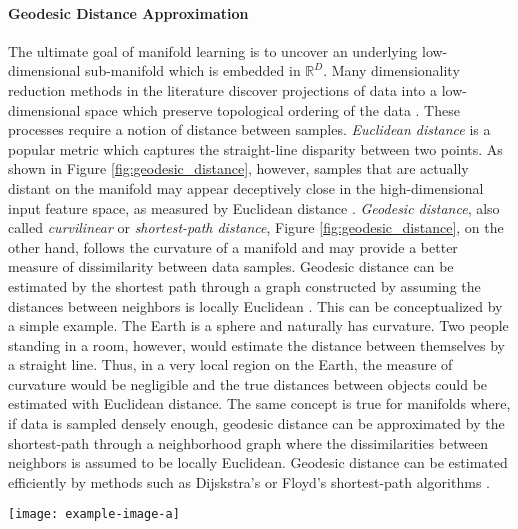 \paragraph{Geodesic Distance Approximation}
The ultimate goal of manifold learning is to uncover an underlying low-dimensional sub-manifold which is embedded in $\mathbb{R}^{D}$.  Many dimensionality reduction methods in the literature discover projections of data into a low-dimensional space which preserve topological ordering of the data \citep{Kegl2008PrincipalManifoldsTextbook}.  These processes require a notion of distance between samples.  \textit{Euclidean distance} is a popular metric which captures the straight-line disparity between two points. As shown in Figure \ref{fig:geodesic_distance}, however, samples that are actually distant on the manifold may appear deceptively close in the high-dimensional input feature space, as measured by Euclidean distance \citep{Tenenbaum2000Isomap}. \textit{Geodesic distance}, also called \textit{curvilinear} or \textit{shortest-path distance}, Figure \ref{fig:geodesic_distance}, on the other hand, follows the curvature of a manifold and may provide a better measure of dissimilarity between data samples.  Geodesic distance can be estimated by the shortest path through a graph constructed by assuming the distances between neighbors is locally Euclidean \citep{Sorzano2014DRReview}.  This can be conceptualized by a simple example.  The Earth is a sphere and naturally has curvature.  Two people standing in a room, however, would estimate the distance between themselves by a straight line.  Thus, in a very local region on the Earth, the measure of curvature would be negligible and the true distances between objects could be estimated with Euclidean distance. The same concept is true for manifolds where, if data is sampled densely enough, geodesic distance can be approximated by the shortest-path through a neighborhood graph where the dissimilarities between neighbors is assumed to be locally Euclidean.  Geodesic distance can be estimated efficiently by methods such as Dijskstra's or Floyd's shortest-path algorithms \citep{Tenenbaum2000Isomap}. 
\begin{center}
	\begin{figure*}[h]
		\centering
		\texttt{[image: example-image-a]}
		\caption[Demonstration of geodesic distance]{Demonstration of geodesic distance}
		\label{fig:geodesic_distance}
	\end{figure*}
\end{center}

